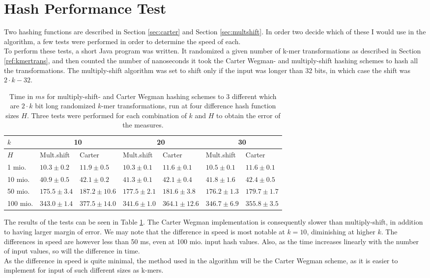 \documentclass[../../main.tex]{subfiles}
\begin{document}
\section{Hash Performance Test}
\label{sec:hashtest}

Two hashing functions are described in Section \ref{sec:carter} and Section \ref{sec:multshift}. In order two decide which of these I would use in the algorithm, a few tests were performed in order to determine the speed of each.\\

To perform these tests, a short Java program was written. It randomized a given number of k-mer transformations as described in Section \ref{ref:kmertrans}, and then counted the number of nanoseconds it took the Carter Wegman- and multiply-shift hashing schemes to hash all the transformations. The multiply-shift algorithm was set to shift only if the input was longer than 32 bits, in which case the shift was $2\cdot k - 32$.\\

\begin{table}[h]
\begin{tabularx}{\textwidth}{| X | X | X | X | X | X | X |}
\hline
$k$ & \multicolumn{2}{c|}{10} & \multicolumn{2}{c|}{20} & \multicolumn{2}{c|}{30} \\
\hline
$H$ & Mult.shift & Carter & Mult.shift & Carter & Mult.shift & Carter \\
 \hline
1 mio. & $10.3\pm 0.2$ & $11.9\pm 0.5$ & $10.3\pm 0.1$ & $11.6\pm 0.1$ & $10.5\pm 0.1$ & $11.6\pm 0.1$\\
10 mio. & $40.9\pm 0.5$ & $42.1\pm0.2$ & $41.3\pm 0.1$ & $42.1\pm0.4$ & $41.8\pm 1.6$ & $42.4\pm0.5$\\
50 mio. & $175.5\pm3.4$ & $187.2\pm 10.6$ & $177.5\pm2.1$  & $181.6\pm3.8$ & $176.2\pm1.3$ & $179.7\pm1.7$\\
100 mio. & $343.0\pm1.4$ & $377.5\pm14.0$ & $341.6\pm1.0$ & $364.1\pm12.6$ & $346.7\pm6.9$ & $355.8\pm3.5$\\
\hline
\end{tabularx}
\caption{Time in $ms$ for multiply-shift- and Carter Wegman hashing schemes to 3 different which are $2\cdot k$ bit long randomized $k$-mer transformations, run at four difference hash function sizes $H$. Three tests were performed for each combination of $k$ and $H$ to obtain the error of the measures.}
\label{table:hashTest}
\end{table}

The results of the tests can be seen in Table \ref{table:hashTest}. The Carter Wegman implementation is consequently slower than multiply-shift, in addition to having larger margin of error. We may note that the difference in speed is most notable at $k=10$, diminishing at higher $k$. The differences in speed are however less than 50 ms, even at 100 mio. input hash values. Also, as the time increases linearly with the number of input values, so will the difference in time.\\

As the difference in speed is quite minimal, the method used in the algorithm will be the Carter Wegman scheme, as it is easier to implement for input of such different sizes as k-mers.
\end{document}
